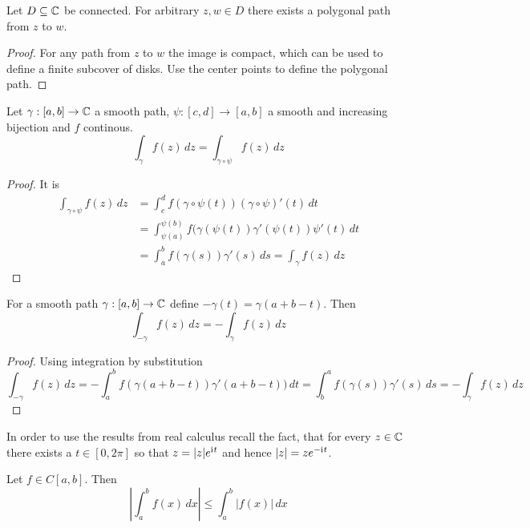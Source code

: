 \begin{lemma}
	Let \( D \subseteq \mathbb{C} \) be connected. For arbitrary \( z, w \in D \) there exists a polygonal path from
	\( z \) to \( w \).
\end{lemma}
\begin{proof}
	For any path from \( z \) to \( w \) the image is compact, which can be used to define a finite subcover of disks.
	Use the center points to define the polygonal path.
\end{proof}
\bigskip


\begin{lemma}
	Let \( \gamma: [a,b] \to \mathbb{C} \) a smooth path, \( \psi: [c,d] \to [a,b] \) a smooth and increasing bijection
	and \( f \) continous.
	\[
		\int_{\gamma} f(z)\,dz = \int_{\gamma\circ\psi} f(z)\,dz
	\]
\end{lemma}

\begin{proof} It is
	\[
		\begin{split}
			\int_{\gamma\circ\psi} f(z)\,dz
			& = \int_c^d f(\gamma\circ\psi(t))(\gamma\circ\psi)'(t) \,dt \\
			& = \int_{\psi(a)}^{\psi(b)} f(\gamma(\psi(t))\gamma'(\psi(t))\psi'(t) \,dt \\
			& = \int_a^b f(\gamma(s))\gamma'(s) \,ds = \int_{\gamma} f(z)\,dz
		\end{split}
	\]
\end{proof}
\bigskip


\begin{lemma}
	For a smooth path \( \gamma: [a,b] \to \mathbb{C} \) define \(-\gamma(t) = \gamma(a + b - t) \).
	Then
	\[
		\int_{-\gamma} f(z)\,dz = -\int_{\gamma} f(z)\,dz
	\]
\end{lemma}

\begin{proof} Using integration by substitution
	\[
		\int_{-\gamma} f(z)\,dz
		= - \int_a^b f(\gamma(a + b - t))\gamma'(a + b - t)) \,dt
		= \int_b^a f(\gamma(s))\gamma'(s) \,ds
		= - \int_{\gamma} f(z)\,dz
	\]
\end{proof}
\bigskip


In order to use the results from real calculus recall the fact, that for every \( z \in \mathbb{C} \)
there exists a \( t \in [0,2\pi] \) so that \( z = |z|e^{\mathrm{i}\mkern1mu t} \) and hence \( |z| = ze^{-\mathrm{i}\mkern1mu t} \).
\bigskip


\begin{lemma}
	Let \( f \in C[a,b] \). Then
	\[
		\left|\int_a^b f(x)\,dx \right| \le \int_a^b |f(x)|\,dx
	\]
\end{lemma}

